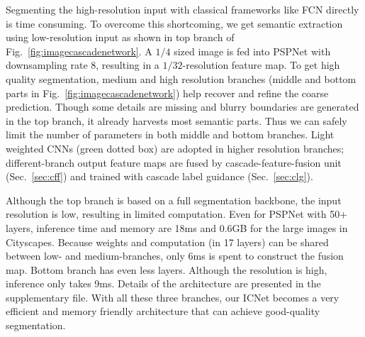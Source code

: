 \documentclass[runningheads]{llncs}
\begin{document}
Segmenting the high-resolution input with classical frameworks like FCN directly is time consuming. To overcome this shortcoming, we get semantic extraction using low-resolution input as shown in top branch of Fig.~\ref{fig:imagecascadenetwork}. A $1/4$ sized image is fed into PSPNet with downsampling rate 8, resulting in a $1/32$-resolution feature map. To get high quality segmentation, medium and high resolution branches (middle and bottom parts in Fig.~\ref{fig:imagecascadenetwork}) help recover and refine the coarse prediction. Though some details are missing and blurry boundaries are generated in the top branch, it already harvests most semantic parts. Thus we can safely limit the number of parameters in both middle and bottom branches. Light weighted CNNs (green dotted box) are adopted in higher resolution branches; different-branch output feature maps are fused by cascade-feature-fusion unit (Sec.~\ref{sec:cff}) and trained with cascade label guidance (Sec.~\ref{sec:clg}).

Although the top branch is based on a full segmentation backbone, the input resolution is low, resulting in limited computation. Even for PSPNet with 50+ layers, inference time and memory are 18ms and 0.6GB for the large images in Cityscapes. Because weights and computation (in 17 layers) can be shared between low- and medium-branches, only 6ms is spent to construct the fusion map. Bottom branch has even less layers. Although the resolution is high, inference only takes 9ms. Details of the architecture are presented in the supplementary file. With all these three branches, our ICNet becomes a very efficient and memory friendly architecture that can achieve good-quality segmentation.
\end{document}
